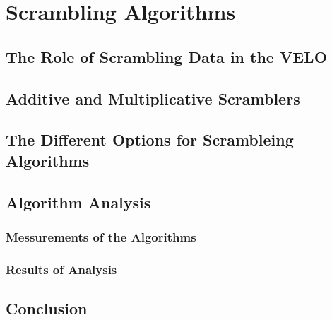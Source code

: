 \section{Scrambling Algorithms}

	\subsection{The Role of Scrambling Data in the VELO}

	\subsection{Additive and Multiplicative Scramblers}

	\subsection{The Different Options for Scrambleing Algorithms}

	\subsection{Algorithm Analysis}

	\subsubsection{Messurements of the Algorithms}

	\subsubsection{Results of Analysis}

	\subsection{Conclusion}